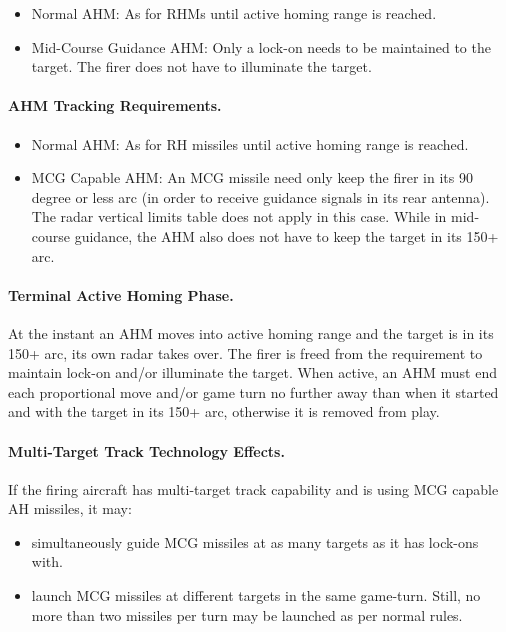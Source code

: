 \begin{itemize}

    \item Normal AHM: As for RHMs until active homing range is reached.

    \item Mid-Course Guidance AHM: Only a lock-on needs to be maintained to the target. The firer does not have to illuminate the target.  

\end{itemize}

\paragraph{AHM Tracking Requirements.}

\begin{itemize}

    \item Normal AHM: As for RH missiles until active homing range is reached.

    \item MCG Capable AHM: An MCG missile need only keep the firer in its 90 degree or less arc (in order to receive guidance signals in its rear antenna). The radar vertical limits table does not apply in this case. While in mid-course guidance, the AHM also does not have to keep the target in its 150+ arc.

\end{itemize}

\paragraph{Terminal Active Homing Phase.} At the instant an AHM moves into active homing range and the target is in its 150+ arc, its own radar takes over. The firer is freed from the requirement to maintain lock-on and/or illuminate the target.  When active, an AHM must end each proportional move and/or game turn no further away than when it started and with the target in its 150+ arc, otherwise it is removed from play.

\paragraph{Multi-Target Track Technology Effects.} If the firing aircraft has multi-target track capability and is using MCG capable AH missiles, it may:

\begin{itemize}

    \item simultaneously guide MCG missiles at as many targets as it has lock-ons with.

    \item launch MCG missiles at different targets in the same game-turn. Still, no more than two missiles per turn may be launched as per normal rules.

\end{itemize}


